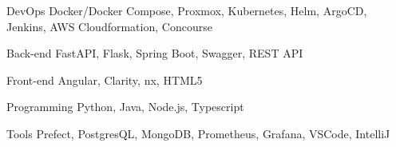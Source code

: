 

\begin{cvskills}

  \cvskill
    {DevOps} %
    {Docker/Docker Compose, Proxmox, Kubernetes, Helm, ArgoCD, Jenkins, AWS Cloudformation, Concourse} %

  \cvskill
    {Back-end} %
    {FastAPI, Flask, Spring Boot, Swagger, REST API} %

  \cvskill
    {Front-end} %
    {Angular, Clarity, nx, HTML5} %

  \cvskill
    {Programming} %
    {Python, Java, Node.js, Typescript} %
    
  \cvskill
    {Tools} %
    {Prefect, PostgresQL, MongoDB, Prometheus, Grafana, VSCode, IntelliJ} %

\end{cvskills}